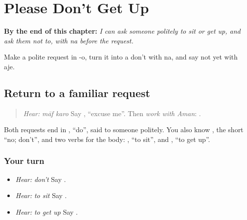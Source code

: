 
\chapter{Please Don't Get Up}
\label{ch:pa-a2-na-request}

\begin{chapteropening}
\textbf{By the end of this chapter:} \emph{I can ask someone politely to sit or get up, and ask them not to, with na before the request.}

Make a polite request in -o, turn it into a don't with na, and say not yet with aje.
\end{chapteropening}

\section[\texorpdfstring{\pa{ਮਾਫ਼} \pa{ਕਰੋ} · \pa{ਨਾ} (māf karo · nā)}{ਮਾਫ਼ ਕਰੋ · ਨਾ (māf karo · nā)}]{Return to a familiar request}

\label{lesson:PA-C213-request-return}



\begin{quote}
\emph{Hear:} \emph{māf karo} Say \textbf{ }, \textquotedblleft{}excuse me\textquotedblright{}. Then \emph{work with Aman}: \textbf{   }.
\end{quote}

\begin{grammarlens}[title={Grammar Lens}]
Both requests end in \textbf{}, \textquotedblleft{}do\textquotedblright{}, said to someone politely. You also know \textbf{}, the short \textquotedblleft{}no; don't\textquotedblright{}, and two verbs for the body: \textbf{}, \textquotedblleft{}to sit\textquotedblright{}, and \textbf{}, \textquotedblleft{}to get up\textquotedblright{}.
\end{grammarlens}

\subsection*{Your turn}
\begin{itemize}
\raggedright
  \item \emph{Hear:} \emph{don't} Say \textbf{}.
  \item \emph{Hear:} \emph{to sit} Say \textbf{}.
  \item \emph{Hear:} \emph{to get up} Say \textbf{}.
\end{itemize}

